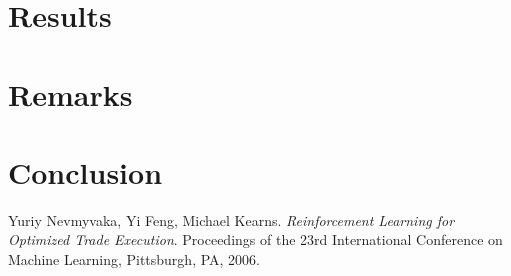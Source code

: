 \documentclass[12pt]{extarticle}
\begin{document}
\section{Results}

\section{Remarks}

\section{Conclusion}

\begin{thebibliography}{9}
Yuriy Nevmyvaka, Yi Feng, Michael Kearns.
\textit{Reinforcement Learning for Optimized Trade Execution}.
Proceedings of the 23rd International Conference on Machine Learning, Pittsburgh, PA, 2006.
\end{thebibliography}
\end{document}
